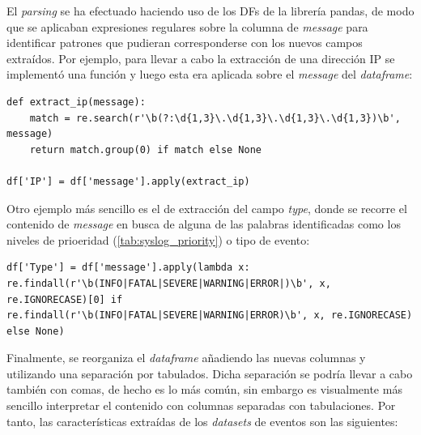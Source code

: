 El \textit{parsing} se ha efectuado haciendo uso de los \gls{DF}s de la librería pandas, de modo que se aplicaban expresiones regulares sobre la columna de \textit{message} para identificar patrones que pudieran corresponderse con los nuevos campos extraídos. Por ejemplo, para llevar a cabo la extracción de una dirección \gls{IP} se implementó una función y luego esta era aplicada sobre el \textit{message} del \textit{dataframe}:

\begin{center}
\begin{mdframed}
\scriptsize
    \begin{verbatim}
def extract_ip(message):
    match = re.search(r'\b(?:\d{1,3}\.\d{1,3}\.\d{1,3}\.\d{1,3})\b', message)
    return match.group(0) if match else None

df['IP'] = df['message'].apply(extract_ip)
    \end{verbatim}
\end{mdframed}
\end{center}

Otro ejemplo más sencillo es el de extracción del campo \textit{type}, donde se recorre el contenido de \textit{message} en busca de alguna de las palabras identificadas como los niveles de prioeridad (\ref{tab:syslog_priority}) o tipo de evento:

\begin{center}
\begin{mdframed}
\scriptsize
    \begin{verbatim}
df['Type'] = df['message'].apply(lambda x:
re.findall(r'\b(INFO|FATAL|SEVERE|WARNING|ERROR|)\b', x, re.IGNORECASE)[0] if 
re.findall(r'\b(INFO|FATAL|SEVERE|WARNING|ERROR)\b', x, re.IGNORECASE) else None)

    \end{verbatim}
\end{mdframed}
\end{center}

Finalmente, se reorganiza el \textit{dataframe} añadiendo las nuevas columnas y utilizando una separación por tabulados. Dicha separación se podría llevar a cabo también con comas, de hecho es lo más común, sin embargo es visualmente más sencillo interpretar el contenido con columnas separadas con tabulaciones. Por tanto, las características extraídas de los \textit{datasets} de eventos son las siguientes: \\

